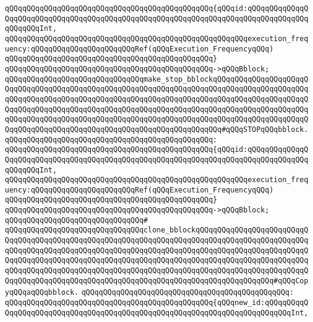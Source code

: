 \verb|qQQqqQQqqQQqqQQqqQQqqQQqqQQqqQQqqQQqqQQqqQQqqQQq{qQQqid:qQQqqQQqqQQqqQQqqQQqqQQqqQQqqQQqqQQqqQQqqQQqqQQqqQQqqQQqqQQqqQQqqQQqqQQqqQQqqQQqqQQqqQQqqQQqInt,|\newline
\verb|qQQqqQQqqQQqqQQqqQQqqQQqqQQqqQQqqQQqqQQqqQQqqQQqqQQqqQQqexecution_frequency:qQQqqQQqqQQqqQQqqQQqqQQqRef(qQQqExecution_FrequencyqQQq)|\newline
\verb|qQQqqQQqqQQqqQQqqQQqqQQqqQQqqQQqqQQqqQQqqQQqqQQq}|\newline
\verb|qQQqqQQqqQQqqQQqqQQqqQQqqQQqqQQqqQQqqQQqqQQqqQQq->qQQqBblock;|\newline
\newline
\verb|qQQqqQQqqQQqqQQqqQQqqQQqqQQqqQQqmake_stop_bblockqQQqqQQqqQQqqQQqqQQqqQQqqQQqqQQqqQQqqQQqqQQqqQQqqQQqqQQqqQQqqQQqqQQqqQQqqQQqqQQqqQQqqQQqqQQqqQQqqQQqqQQqqQQqqQQqqQQqqQQqqQQqqQQqqQQqqQQqqQQqqQQqqQQqqQQqqQQqqQQqqQQqqQQqqQQqqQQqqQQqqQQqqQQqqQQqqQQqqQQqqQQqqQQqqQQqqQQqqQQqqQQqqQQqqQQqqQQqqQQqqQQqqQQqqQQqqQQqqQQqqQQqqQQqqQQqqQQqqQQqqQQqqQQqqQQqqQQqqQQqqQQqqQQqqQQqqQQqqQQqqQQqqQQqqQQqqQQqqQQqqQQqqQQqqQQq#qQQqSTOPqQQqbblock.|\newline
\verb|qQQqqQQqqQQqqQQqqQQqqQQqqQQqqQQqqQQqqQQqqQQqqQQq:|\newline
\verb|qQQqqQQqqQQqqQQqqQQqqQQqqQQqqQQqqQQqqQQqqQQqqQQq{qQQqid:qQQqqQQqqQQqqQQqqQQqqQQqqQQqqQQqqQQqqQQqqQQqqQQqqQQqqQQqqQQqqQQqqQQqqQQqqQQqqQQqqQQqqQQqqQQqInt,|\newline
\verb|qQQqqQQqqQQqqQQqqQQqqQQqqQQqqQQqqQQqqQQqqQQqqQQqqQQqqQQqexecution_frequency:qQQqqQQqqQQqqQQqqQQqqQQqRef(qQQqExecution_FrequencyqQQq)|\newline
\verb|qQQqqQQqqQQqqQQqqQQqqQQqqQQqqQQqqQQqqQQqqQQqqQQq}|\newline
\verb|qQQqqQQqqQQqqQQqqQQqqQQqqQQqqQQqqQQqqQQqqQQqqQQq->qQQqBblock;|\newline
\verb|qQQqqQQqqQQqqQQqqQQqqQQqqQQqqQQq#|\newline
\verb|qQQqqQQqqQQqqQQqqQQqqQQqqQQqqQQqclone_bblockqQQqqQQqqQQqqQQqqQQqqQQqqQQqqQQqqQQqqQQqqQQqqQQqqQQqqQQqqQQqqQQqqQQqqQQqqQQqqQQqqQQqqQQqqQQqqQQqqQQqqQQqqQQqqQQqqQQqqQQqqQQqqQQqqQQqqQQqqQQqqQQqqQQqqQQqqQQqqQQqqQQqqQQqqQQqqQQqqQQqqQQqqQQqqQQqqQQqqQQqqQQqqQQqqQQqqQQqqQQqqQQqqQQqqQQqqQQqqQQqqQQqqQQqqQQqqQQqqQQqqQQqqQQqqQQqqQQqqQQqqQQqqQQqqQQqqQQqqQQqqQQqqQQqqQQqqQQqqQQqqQQqqQQqqQQqqQQqqQQqqQQqqQQqqQQqqQQqqQQqqQQqqQQq#qQQqCopyqQQqaqQQqbblock.|\newline
\verb|qQQqqQQqqQQqqQQqqQQqqQQqqQQqqQQqqQQqqQQqqQQqqQQq:|\newline
\verb|qQQqqQQqqQQqqQQqqQQqqQQqqQQqqQQqqQQqqQQqqQQqqQQq{qQQqnew_id:qQQqqQQqqQQqqQQqqQQqqQQqqQQqqQQqqQQqqQQqqQQqqQQqqQQqqQQqqQQqqQQqqQQqqQQqqQQqInt,|\newline

